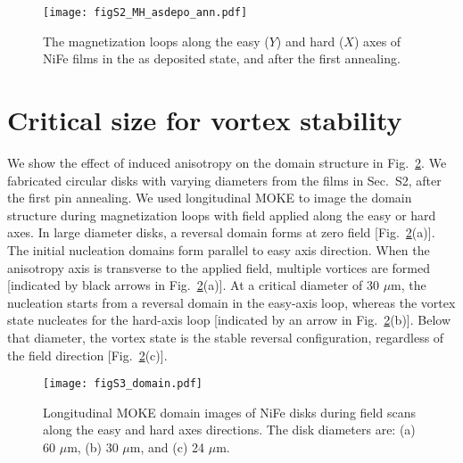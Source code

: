 \begin{figure}[hb]
 \begin{center}
     \texttt{[image: figS2\_MH\_asdepo\_ann.pdf]}
    \caption{The magnetization loops along the easy ($Y$) and hard ($X$) axes of NiFe films in the as deposited state, and after the first annealing.}
    \label{fig:sup_aniso}
 \end{center}
\end{figure}

\newpage

\section{Critical size for vortex stability}

We show the effect of induced anisotropy on the domain structure in Fig.~\ref{fig:sup_domain}. We fabricated circular disks with varying diameters from the films in Sec.~S2, after the first pin annealing. We used longitudinal MOKE to image the domain structure during magnetization loops with field applied along the easy or hard axes. In large diameter disks, a reversal domain forms at zero field [Fig.~\ref{fig:sup_domain}(a)]. The initial nucleation domains form parallel to easy axis direction. When the anisotropy axis is transverse to the applied field, multiple vortices are formed [indicated by {black} arrows in Fig.~\ref{fig:sup_domain}(a)]. At a critical diameter of 30 $\mu$m, the nucleation starts from a reversal domain in the easy-axis loop, whereas the vortex state nucleates for the hard-axis loop [indicated by an arrow in Fig.~\ref{fig:sup_domain}(b)]. Below that diameter, the vortex state is the stable reversal configuration, regardless of the field direction [Fig.~\ref{fig:sup_domain}(c)].


\begin{figure}[hb]
 \begin{center}
     \texttt{[image: figS3\_domain.pdf]}
    \caption{Longitudinal MOKE domain images of NiFe disks during field scans along the easy and hard axes directions. The disk diameters are: (a) 60 $\mu$m, (b) 30 $\mu$m, and (c) 24 $\mu$m.}
    \label{fig:sup_domain}
 \end{center}
\end{figure}

\newpage
